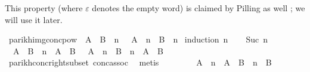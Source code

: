 \begin{isabellebody}
\begin{isamarkuptext}
This property (where $\varepsilon$ denotes the empty word) is claimed by
Pilling as well \cite{Pilling}; we will use it later.%
\end{isamarkuptext}\isamarkuptrue%
\isamarkupfalse%
\ parikh{\isacharunderscore}{\kern0pt}img{\isacharunderscore}{\kern0pt}conc{\isacharunderscore}{\kern0pt}pow{\isacharcolon}{\kern0pt}\ {\isachardoublequoteopen}{\isasymPsi}\ {\isacharparenleft}{\kern0pt}{\isacharparenleft}{\kern0pt}A\ {\isacharat}{\kern0pt}{\isacharat}{\kern0pt}\ B{\isacharparenright}{\kern0pt}\ {\isacharcircum}{\kern0pt}{\isacharcircum}{\kern0pt}\ n{\isacharparenright}{\kern0pt}\ {\isasymsubseteq}\ {\isasymPsi}\ {\isacharparenleft}{\kern0pt}A\ {\isacharcircum}{\kern0pt}{\isacharcircum}{\kern0pt}\ n\ {\isacharat}{\kern0pt}{\isacharat}{\kern0pt}\ B\ {\isacharcircum}{\kern0pt}{\isacharcircum}{\kern0pt}\ n{\isacharparenright}{\kern0pt}{\isachardoublequoteclose}\isanewline
%
\isadelimproof
%
\endisadelimproof
%
\isatagproof
{}\isamarkupfalse%
\ {\isacharparenleft}{\kern0pt}induction\ n{\isacharparenright}{\kern0pt}\isanewline
\ \ \isamarkupfalse%
\ {\isacharparenleft}{\kern0pt}Suc\ n{\isacharparenright}{\kern0pt}\isanewline
\ \ \isamarkupfalse%
\ \isamarkupfalse%
\ {\isachardoublequoteopen}{\isasymPsi}\ {\isacharparenleft}{\kern0pt}{\isacharparenleft}{\kern0pt}A\ {\isacharat}{\kern0pt}{\isacharat}{\kern0pt}\ B{\isacharparenright}{\kern0pt}\ {\isacharcircum}{\kern0pt}{\isacharcircum}{\kern0pt}\ n\ {\isacharat}{\kern0pt}{\isacharat}{\kern0pt}\ A\ {\isacharat}{\kern0pt}{\isacharat}{\kern0pt}\ B{\isacharparenright}{\kern0pt}\ {\isasymsubseteq}\ {\isasymPsi}\ {\isacharparenleft}{\kern0pt}A\ {\isacharcircum}{\kern0pt}{\isacharcircum}{\kern0pt}\ n\ {\isacharat}{\kern0pt}{\isacharat}{\kern0pt}\ B\ {\isacharcircum}{\kern0pt}{\isacharcircum}{\kern0pt}\ n\ {\isacharat}{\kern0pt}{\isacharat}{\kern0pt}\ A\ {\isacharat}{\kern0pt}{\isacharat}{\kern0pt}\ B{\isacharparenright}{\kern0pt}{\isachardoublequoteclose}\isanewline
\ \ \ \ \isamarkupfalse%
\ parikh{\isacharunderscore}{\kern0pt}conc{\isacharunderscore}{\kern0pt}right{\isacharunderscore}{\kern0pt}subset\ conc{\isacharunderscore}{\kern0pt}assoc\ \isamarkupfalse%
\ metis\isanewline
\ \ \isamarkupfalse%
\ \isamarkupfalse%
\ {\isachardoublequoteopen}{\isasymdots}\ {\isacharequal}{\kern0pt}\ {\isasymPsi}\ {\isacharparenleft}{\kern0pt}A\ {\isacharcircum}{\kern0pt}{\isacharcircum}{\kern0pt}\ n\ {\isacharat}{\kern0pt}{\isacharat}{\kern0pt}\ A\ {\isacharat}{\kern0pt}{\isacharat}{\kern0pt}\ B\ {\isacharcircum}{\kern0pt}{\isacharcircum}{\kern0pt}\ n\ {\isacharat}{\kern0pt}{\isacharat}{\kern0pt}\ B{\isacharparenright}{\kern0pt}{\isachardoublequoteclose}\isanewline

\end{isabellebody}
